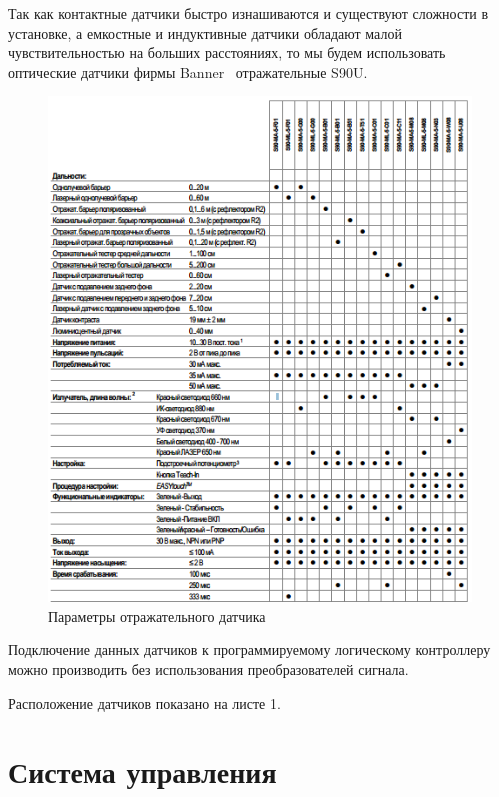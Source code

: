 Так как контактные датчики быстро изнашиваются и существуют сложности в установке, а емкостные и индуктивные датчики обладают малой чувствительностью на больших расстояниях, то мы будем использовать оптические датчики фирмы Banner~\cite{tur:optical} отражательные S90U.

\begin{figure}[ht]
    \includegraphics[width=1\linewidth]{Figures/params.png}
    \caption{Параметры отражательного датчика}
    \label{fig:params}
\end{figure}

Подключение данных датчиков к программируемому логическому контроллеру можно производить без использования преобразователей сигнала.

Расположение датчиков показано на листе 1. 

\section{Система управления}

